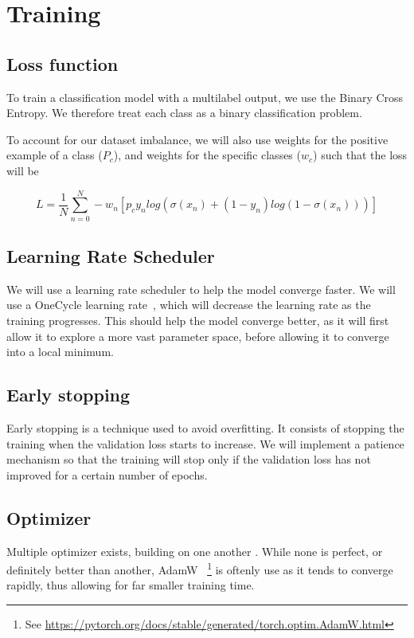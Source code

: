 \documentclass[11pt]{article}
\begin{document}
    \section{Training}


    \subsection{Loss function}
        To train a classification model with a multilabel output, we use the Binary Cross Entropy. We therefore treat
        each class as a binary classification problem.

        To account for our dataset imbalance, we will also use weights for the positive example of a class ($P_c$), and weights for the specific classes ($w_c$) such that the loss will be

        \begin{equation}
            L = \frac{1}{N}\sum_{n=0}^N -w_n[p_c y_n log(\sigma(x_n)+(1-y_n) log(1-\sigma(x_n)))]
        \end{equation}

    \subsection{Learning Rate Scheduler}

        We will use a learning rate scheduler to help the model converge faster. We will use a OneCycle learning rate~\cite{onecyclelr}, which will
        decrease the learning rate as the training progresses. This should help the model converge better, as it will first allow it to explore a more vast
        parameter space, before allowing it to converge into a local minimum.

    \subsection{Early stopping}

        Early stopping is a technique used to avoid overfitting. It consists of stopping the training when the validation loss starts to increase. We will
        implement a patience mechanism so that the training will stop only if the validation loss has not improved for a certain number of epochs.
    \subsection{Optimizer}

        Multiple optimizer exists, building on one another . While none is perfect, or definitely better than another, AdamW~\cite{adamw} \footnote{See \url{https://pytorch.org/docs/stable/generated/torch.optim.AdamW.html}} is oftenly use as it tends
        to converge rapidly, thus allowing for far smaller training time.
\end{document}
